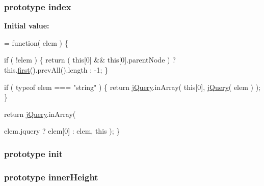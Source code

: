 \subsubsection[{index}]{ {\bf prototype} index}\label{jquery-1_810_82-vsdoc_8js_a75bb12d1f23302a9eea93a6d89d0193e}
{\bfseries Initial value\+:}
\begin{DoxyCode}
= \textcolor{keyword}{function}( elem ) \{



        
        \textcolor{keywordflow}{if} ( !elem ) \{
            \textcolor{keywordflow}{return} ( \textcolor{keyword}{this}[0] && \textcolor{keyword}{this}[0].parentNode ) ? this.\hyperlink{jquery-1_810_82-vsdoc_8js_a436adcac6bdff190fbce85670078e885}{first}().prevAll().length : -1;
        \}

        
        \textcolor{keywordflow}{if} ( typeof elem === \textcolor{stringliteral}{"string"} ) \{
            \textcolor{keywordflow}{return} \hyperlink{jquery-1_810_82-vsdoc_8js_add5237586d970a38a81f990e8eb28c6c}{jQuery}.inArray( \textcolor{keyword}{this}[0], \hyperlink{jquery-1_810_82-vsdoc_8js_add5237586d970a38a81f990e8eb28c6c}{jQuery}( elem ) );
        \}

        
        \textcolor{keywordflow}{return} \hyperlink{jquery-1_810_82-vsdoc_8js_add5237586d970a38a81f990e8eb28c6c}{jQuery}.inArray(
            
            elem.jquery ? elem[0] : elem, \textcolor{keyword}{this} );
    \}
\end{DoxyCode}
\hypertarget{jquery-1_810_82-vsdoc_8js_a4d7eae8a73366d18982efeb109237a74}{}
\subsubsection[{init}]{ {\bf prototype} init}\label{jquery-1_810_82-vsdoc_8js_a4d7eae8a73366d18982efeb109237a74}
\hypertarget{jquery-1_810_82-vsdoc_8js_a74b254137855e091d242946fbbe2fbe8}{}
\subsubsection[{inner\+Height}]{ {\bf prototype} inner\+Height}\label{jquery-1_810_82-vsdoc_8js_a74b254137855e091d242946fbbe2fbe8}
\hypertarget{jquery-1_810_82-vsdoc_8js_a903029bceb8e6512b7e550f1ac0efbd2}{}
